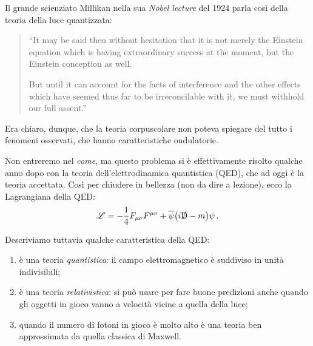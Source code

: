 \documentclass[a4paper,12pt]{article}
\newcommand{\DD}{\mathrm{D}}
\begin{document}
Il grande scienziato Millikan nella sua \emph{Nobel lecture} del 1924
\autocite[]{millikanRobertMillikanNobel1924} parla così della teoria della luce quantizzata: 

\begin{quotation}
``It may be said then without hesitation that it
is not merely the Einstein equation which is having extraordinary success at
the moment, but the Einstein conception as well.

But until it can account for the facts of interference and the other effects
which have seemed thus far to be irreconcilable with it, we must withhold
our full assent.''
\end{quotation}

Era chiaro, dunque, che la teoria corpuscolare non poteva spiegare del tutto i fenomeni osservati, che hanno caratteristiche ondulatorie.

Non entreremo nel \emph{come}, ma questo problema si è effettivamente risolto qualche anno dopo con la teoria dell'elettrodinamica quantistica (QED), che ad oggi è la teoria accettata. 
Così per chiudere in bellezza (non da dire a lezione), ecco la Lagrangiana della QED:
%
\begin{align}
\mathscr{L} = - \frac{1}{4}  F_{\mu \nu } F^{\mu \nu }
+ \overline{\psi} \qty(i \slashed{\DD} -m ) \psi 
\,.
\end{align}

Descriviamo tuttavia qualche caratteristica della QED: 
\begin{enumerate}
    \item è una teoria \emph{quantistica}: il campo elettromagnetico è suddiviso in unità indivisibili;
    \item è una teoria \emph{relativistica}: si può usare per fare buone predizioni anche quando gli oggetti in gioco vanno a velocità vicine a quella della luce;
    \item quando il numero di fotoni in gioco è molto alto è una teoria ben approssimata da quella classica di Maxwell.
\end{enumerate}

\end{document}
